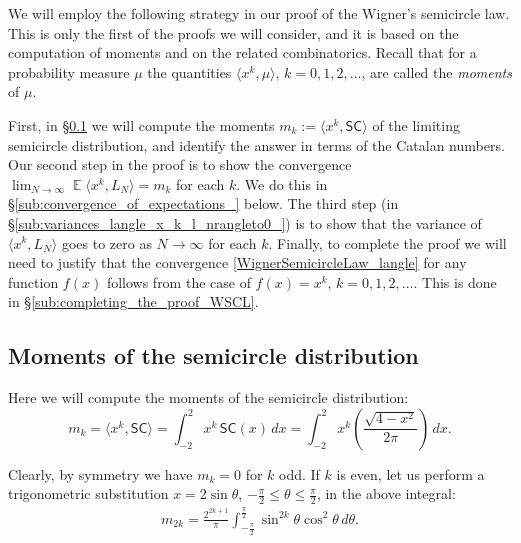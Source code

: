 \documentclass[letterpaper,11pt,oneside,reqno]{amsart}
\numberwithin{equation}{section}
\newcommand{\SC}{\mathsf{SC}}
\DeclareMathOperator{\EE}{\mathbb{E}}
\theoremstyle{definition}
\begin{document}
We will employ the following strategy in our proof of the Wigner's semicircle
law. This is only the first of the proofs we will consider, and it is based on
the computation of moments and on the related combinatorics. Recall that for a
probability measure $\mu$ the quantities $\langle x^{k},\mu\rangle$,
$k=0,1,2,\ldots$, are called the \emph{moments} of $\mu$.

First, in \S \ref{sub:moments_of_the_semicircle_distribution}
we will compute the moments  $m_k:=\langle x^k, \SC\rangle$ of the
limiting semicircle distribution, and identify the answer in terms of the
Catalan numbers. Our second step in the proof is to show the convergence
$\lim_{N\to\infty}\EE \langle x^k,L_N\rangle = m_k$ for each $k$. We do this in \S \ref{sub:convergence_of_expectations_}
below.
The third
step (in \S \ref{sub:variances_langle_x_k_l_nrangleto0_}) 
is to show that  the variance of $\langle x^k,L_N\rangle$ goes to zero as
$N\to\infty$ for each $k$. Finally, to complete the proof we will need to
justify that  the convergence \eqref{WignerSemicircleLaw_langle} for any
function $f(x)$ follows from the case of $f(x)=x^{k}$, $k=0,1,2,\ldots$.
This is done in \S \ref{sub:completing_the_proof_WSCL}.


\subsection{Moments of the semicircle distribution} %
\label{sub:moments_of_the_semicircle_distribution}

Here we will compute the moments of the semicircle distribution:
\begin{equation*}
m_k=\langle x^k, \SC\rangle
=\int_{-2}^2 x^k\, \SC(x)\,dx
=\int_{-2}^2 x^k \left( \frac{\sqrt{4-x^2}}{2\pi}\right)\,dx.
\end{equation*}

Clearly, by symmetry we have $m_k=0$ for $k$ odd. If $k$ is even, let us perform a trigonometric substitution
$x=2\sin \theta$, $-\frac\pi2\le \theta\le \frac\pi2$, in the above integral:
\begin{align}\label{SC_moments_m_2k}
	m_{2k}=\frac{2^{2k+1}}{\pi}\int_{-\frac\pi2}^{\frac\pi2}\sin^{2k}\theta\cos^{2}\theta \,d\theta.
\end{align}
\end{document}

